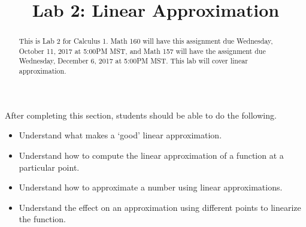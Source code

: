 \documentclass{ximera}
\title{Lab 2: Linear Approximation}
\begin{document}
\begin{abstract}
This is Lab 2 for Calculus 1. Math 160 will have this assignment due Wednesday, October 11, 2017 at 5:00PM MST, and Math 157 will have the assignment due Wednesday, December 6, 2017  at 5:00PM MST. This lab will cover linear approximation.
\end{abstract}

\maketitle

\begin{sectionOutcomes}

After completing this section, students should be able to do the following.

\begin{itemize}
    \item Understand what makes a `good' linear approximation.
	\item Understand how to compute the linear approximation of a function at a particular point.
    \item Understand how to approximate a number using linear approximations.
    \item Understand the effect on an approximation using different points to linearize the function.
\end{itemize}

\end{sectionOutcomes}
\end{document}

